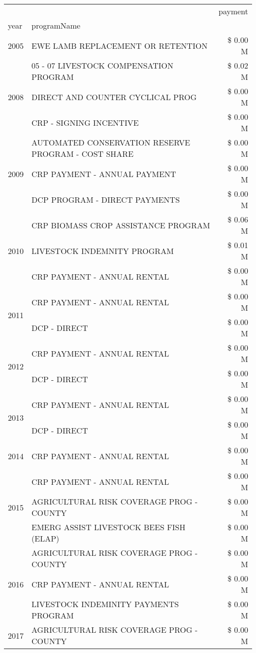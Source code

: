 \begin{tabular}{llr}
\toprule
 &  & payment \\
year & programName &  \\
\midrule
2005 & EWE LAMB REPLACEMENT OR RETENTION & \$ 0.00 M \\
\cline{1-3}
\multirow[t]{3}{*}{2008} & 05 - 07 LIVESTOCK COMPENSATION PROGRAM & \$ 0.02 M \\
 & DIRECT AND COUNTER CYCLICAL PROG & \$ 0.00 M \\
 & CRP - SIGNING INCENTIVE & \$ 0.00 M \\
\cline{1-3}
\multirow[t]{3}{*}{2009} & AUTOMATED CONSERVATION RESERVE PROGRAM - COST SHARE & \$ 0.00 M \\
 & CRP PAYMENT - ANNUAL PAYMENT & \$ 0.00 M \\
 & DCP PROGRAM - DIRECT PAYMENTS & \$ 0.00 M \\
\cline{1-3}
\multirow[t]{3}{*}{2010} & CRP BIOMASS CROP ASSISTANCE PROGRAM & \$ 0.06 M \\
 & LIVESTOCK INDEMNITY PROGRAM & \$ 0.01 M \\
 & CRP PAYMENT - ANNUAL RENTAL & \$ 0.00 M \\
\cline{1-3}
\multirow[t]{2}{*}{2011} & CRP PAYMENT - ANNUAL RENTAL & \$ 0.00 M \\
 & DCP - DIRECT & \$ 0.00 M \\
\cline{1-3}
\multirow[t]{2}{*}{2012} & CRP PAYMENT - ANNUAL RENTAL & \$ 0.00 M \\
 & DCP - DIRECT & \$ 0.00 M \\
\cline{1-3}
\multirow[t]{2}{*}{2013} & CRP PAYMENT - ANNUAL RENTAL & \$ 0.00 M \\
 & DCP - DIRECT & \$ 0.00 M \\
\cline{1-3}
2014 & CRP PAYMENT - ANNUAL RENTAL & \$ 0.00 M \\
\cline{1-3}
\multirow[t]{3}{*}{2015} & CRP PAYMENT - ANNUAL RENTAL & \$ 0.00 M \\
 & AGRICULTURAL RISK COVERAGE PROG - COUNTY & \$ 0.00 M \\
 & EMERG ASSIST LIVESTOCK BEES FISH (ELAP) & \$ 0.00 M \\
\cline{1-3}
\multirow[t]{3}{*}{2016} & AGRICULTURAL RISK COVERAGE PROG - COUNTY & \$ 0.00 M \\
 & CRP PAYMENT - ANNUAL RENTAL & \$ 0.00 M \\
 & LIVESTOCK INDEMINITY PAYMENTS PROGRAM & \$ 0.00 M \\
\cline{1-3}
\multirow[t]{3}{*}{2017} & AGRICULTURAL RISK COVERAGE PROG - COUNTY & \$ 0.00 M \\

\end{tabular}
